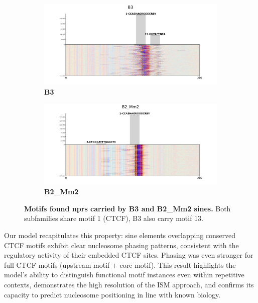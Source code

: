 \documentclass[11pt]{book}
\begin{document}
\begin{figure}[htbp]
    \centering
    \begin{subfigure}{0.49\textwidth}
        \includegraphics[trim=3cm 0cm 2.5cm 1.5cm, clip,width=\linewidth]{Figures/Results/xstreme_onrep_seq/B3.pdf}
        \caption{\textbf{B3}}
        \label{fig:B3}
    \end{subfigure}
    \hfill
    \begin{subfigure}{0.49\textwidth}
        \includegraphics[trim=3cm 0cm 2.5cm 1.5cm, clip,width=\linewidth]{Figures/Results/xstreme_onrep_seq/B2_Mm2.pdf}
        \caption{\textbf{B2\_Mm2}}
        \label{fig:B2_Mm2}
    \end{subfigure}
    \caption{\textbf{Motifs found \glspl{npr} carried by B3 and B2\_Mm2 \glspl{sine}.} Both subfamilies share motif 1 (CTCF), B3 also carry motif 13.}
    \label{fig:SINE_subfamilies}
\end{figure}

Our model recapitulates this property: \gls{sine} elements overlapping conserved CTCF motifs exhibit clear nucleosome phasing patterns, consistent with the regulatory activity of their embedded CTCF sites. Phasing was even stronger for full CTCF motifs (upstream motif + core motif). This result highlights the model’s ability to distinguish functional motif instances even within repetitive contexts, demonstrates the high resolution of the ISM approach, and confirms its capacity to predict nucleosome positioning in line with known biology.
\end{document}
